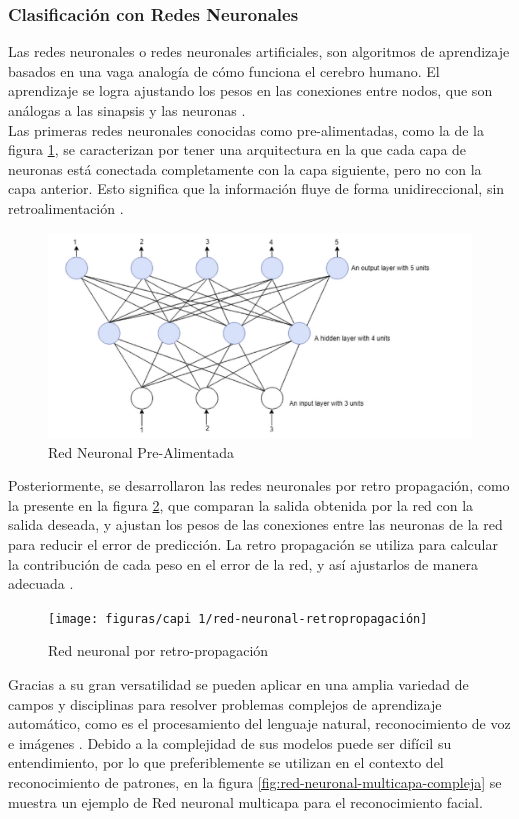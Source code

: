 \subsubsection{Clasificación con Redes Neuronales}
Las redes neuronales o redes neuronales artificiales, son algoritmos de aprendizaje basados en una vaga analogía de cómo funciona el cerebro humano. El aprendizaje se logra ajustando los pesos en las conexiones entre nodos, que son análogas a las sinapsis y las neuronas \citep{sammut2011encyclopedia}. \\
Las primeras redes neuronales conocidas como pre-alimentadas, como la de la figura \ref{fig:red-neuronal-prealimentada}, se caracterizan por tener una arquitectura en la que cada capa de neuronas está conectada completamente con la capa siguiente, pero no con la capa anterior. Esto significa que la información fluye de forma unidireccional, sin retroalimentación \citep{abiodun2018state}. 
\begin{figure}[H]
	\centering
	\includegraphics[width=0.7\linewidth]{figuras/capi 1/red-neuronal-prealimentada}
	\caption{Red Neuronal Pre-Alimentada \citep{abiodun2018state}}
	\label{fig:red-neuronal-prealimentada}
\end{figure}
Posteriormente, se desarrollaron las redes neuronales por retro propagación, como la presente en la figura \ref{fig:red-neuronal-retropropagacion}, que comparan la salida obtenida por la red con la salida deseada, y ajustan los pesos de las conexiones entre las neuronas de la red para reducir el error de predicción. La retro propagación se utiliza para calcular la contribución de cada peso en el error de la red, y así ajustarlos de manera adecuada \citep{abiodun2018state}.
\begin{figure}[H]
	\centering
	\texttt{[image: figuras/capi 1/red-neuronal-retropropagación]}
	\caption{Red neuronal por retro-propagación \citep{abiodun2018state}}
	\label{fig:red-neuronal-retropropagacion}
\end{figure}
Gracias a su gran versatilidad se pueden aplicar en una amplia variedad de campos y disciplinas para resolver problemas complejos de aprendizaje automático, como es el procesamiento del lenguaje natural, reconocimiento de voz e imágenes \citep{abiodun2018state}. Debido a la complejidad de sus modelos puede ser difícil su entendimiento, por lo que preferiblemente se utilizan en el contexto del reconocimiento de patrones, en la figura \ref{fig:red-neuronal-multicapa-compleja} se muestra un ejemplo de Red neuronal multicapa para el reconocimiento facial.
